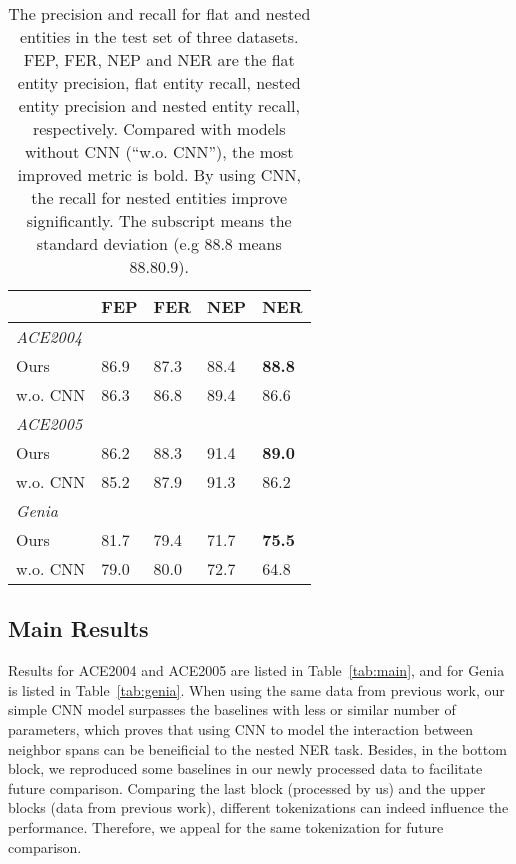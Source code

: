 \documentclass[11pt]{article}
\begin{document}
\begin{table*}[!ht]
\begin{table}[!th]
  \centering
  \small
  \setlength{\tabcolsep}{3pt}
  \begin{tabular}{@{}lllll@{}}
    \toprule
                         & FEP            & FER            & NEP            & NER            \\
                          \midrule
                          \textit{ACE2004}     \\                    
                Ours     & 86.9& 87.3  & 88.4 & \textbf{88.8} \\
         \quad  w.o. CNN & 86.3& 86.8 & 89.4   & 86.6\\
                           \midrule
                           \textit{ACE2005} \\
                Ours      & 86.2 & 88.3  & 91.4 & \textbf{89.0} \\
          \quad  w.o. CNN & 85.2 & 87.9 & 91.3 & 86.2 \\
                           \midrule
                           \textit{Genia} \\
Ours     & 81.7 & 79.4  & 71.7 & \textbf{75.5}\\
          \quad  w.o. CNN & 79.0 & 80.0 & 72.7  & 64.8  \\
          \bottomrule
  \end{tabular}
  \caption{The precision and recall for flat and nested entities in the test set of three datasets. FEP, FER, NEP and NER are the flat entity precision, flat entity recall, nested entity precision and nested entity recall, respectively. Compared with models without CNN (``w.o. CNN''), the most improved metric is bold. By using CNN, the recall for nested entities improve significantly. The subscript means the standard deviation (e.g 88.8 means 88.80.9).}
  \label{tab:why_cnn}
\end{table}

\subsection{Main Results}
Results for ACE2004 and ACE2005 are listed in Table~\ref{tab:main}, and for Genia is listed in Table~\ref{tab:genia}. When using the same data from previous work, our simple CNN model surpasses the baselines with less or similar number of parameters, which proves that using CNN to model the interaction between neighbor spans can be beneificial to the nested NER task. Besides, in the bottom block, we reproduced some baselines in our newly processed data to facilitate future comparison. Comparing the last block (processed by us) and the upper blocks (data from previous work), different tokenizations can indeed influence the performance. Therefore, we appeal for the same tokenization for future comparison.





\end{table*}
\end{document}
